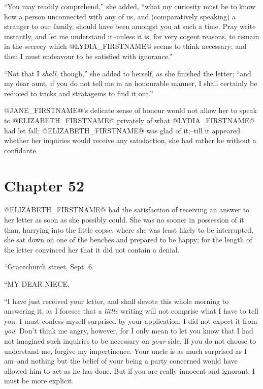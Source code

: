 ``You may readily comprehend,'' she added, ``what my curiosity must be
to know how a person unconnected with any of us, and (comparatively
speaking) a stranger to our family, should have been amongst you at such
a time. Pray write instantly, and let me understand it--unless it is,
for very cogent reasons, to remain in the secrecy which @LYDIA_FIRSTNAME@ seems
to think necessary; and then I must endeavour to be satisfied with
ignorance.''

``Not that I \textit{shall}, though,'' she added to herself, as she finished
the letter; ``and my dear aunt, if you do not tell me in an honourable
manner, I shall certainly be reduced to tricks and stratagems to find it
out.''

@JANE_FIRSTNAME@'s delicate sense of honour would not allow her to speak to
@ELIZABETH_FIRSTNAME@ privately of what @LYDIA_FIRSTNAME@ had let fall; @ELIZABETH_FIRSTNAME@ was glad
of it;--till it appeared whether her inquiries would receive any
satisfaction, she had rather be without a confidante.



\chapter*{Chapter 52}


@ELIZABETH_FIRSTNAME@ had the satisfaction of receiving an answer to her letter as
soon as she possibly could. She was no sooner in possession of it
than, hurrying into the little copse, where she was least likely to
be interrupted, she sat down on one of the benches and prepared to
be happy; for the length of the letter convinced her that it did not
contain a denial.

``Gracechurch street, Sept. 6.

``MY DEAR NIECE,

``I have just received your letter, and shall devote this whole morning
to answering it, as I foresee that a \textit{little} writing will not comprise
what I have to tell you. I must confess myself surprised by your
application; I did not expect it from \textit{you}. Don't think me angry,
however, for I only mean to let you know that I had not imagined such
inquiries to be necessary on \textit{your} side. If you do not choose to
understand me, forgive my impertinence. Your uncle is as much surprised
as I am--and nothing but the belief of your being a party concerned
would have allowed him to act as he has done. But if you are really
innocent and ignorant, I must be more explicit.

